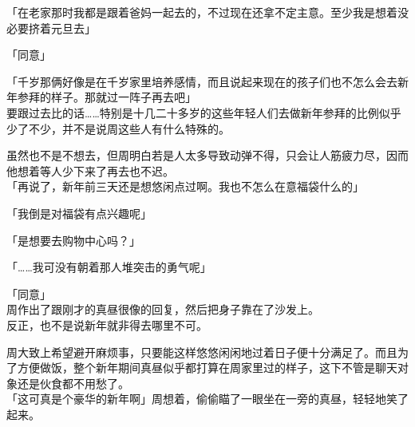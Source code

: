 「在老家那时我都是跟着爸妈一起去的，不过现在还拿不定主意。至少我是想着没必要挤着元旦去」

「同意」

「千岁那俩好像是在千岁家里培养感情，而且说起来现在的孩子们也不怎么会去新年参拜的样子。那就过一阵子再去吧」\\

要跟过去比的话……特别是十几二十多岁的这些年轻人们去做新年参拜的比例似乎少了不少，并不是说周这些人有什么特殊的。

虽然也不是不想去，但周明白若是人太多导致动弹不得，只会让人筋疲力尽，因而他想着等人少下来了再去也不迟。\\

「再说了，新年前三天还是想悠闲点过啊。我也不怎么在意福袋什么的」

「我倒是对福袋有点兴趣呢」

「是想要去购物中心吗？」

「……我可没有朝着那人堆突击的勇气呢」

「同意」\\

周作出了跟刚才的真昼很像的回复，然后把身子靠在了沙发上。\\

反正，也不是说新年就非得去哪里不可。

周大致上希望避开麻烦事，只要能这样悠悠闲闲地过着日子便十分满足了。而且为了方便做饭，整个新年期间真昼似乎都打算在周家里过的样子，这下不管是聊天对象还是伙食都不用愁了。\\

「这可真是个豪华的新年啊」周想着，偷偷瞄了一眼坐在一旁的真昼，轻轻地笑了起来。
